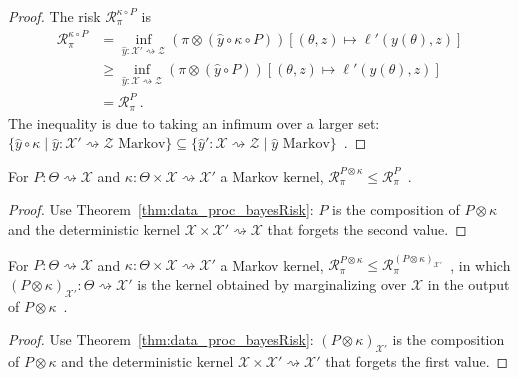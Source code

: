 \begin{proof}\mathlibok
\uses{}
The risk $\mathcal R^{\kappa \circ P}_\pi$ is
\begin{align*}
\mathcal R^{\kappa \circ P}_\pi
&= \inf_{\hat{y} : \mathcal X' \rightsquigarrow \mathcal Z} (\pi \otimes (\hat{y} \circ \kappa \circ P))\left[(\theta, z) \mapsto \ell'(y(\theta), z)\right]
\\
&\ge \inf_{\hat{y} : \mathcal X \rightsquigarrow \mathcal Z} (\pi \otimes (\hat{y} \circ P))\left[(\theta, z) \mapsto \ell'(y(\theta), z)\right]
\\
&= \mathcal R^{P}_\pi
\: .
\end{align*}
The inequality is due to taking an infimum over a larger set: $\{\hat{y} \circ \kappa \mid \hat{y} : \mathcal X' \rightsquigarrow \mathcal Z \text{ Markov}\} \subseteq \{\hat{y}' : \mathcal X \rightsquigarrow \mathcal Z \mid \hat{y} \text{ Markov}\}$~.
\end{proof}

\begin{lemma}
  \label{lem:bayesRisk_compProd_le_fst}
  \mathlibok
  For $P : \Theta \rightsquigarrow \mathcal X$ and $\kappa : \Theta \times \mathcal X \rightsquigarrow \mathcal X'$ a Markov kernel, $\mathcal R^{P \otimes \kappa}_\pi \le \mathcal R^{P}_\pi$~.
\end{lemma}

\begin{proof}\mathlibok
{}
Use Theorem~\ref{thm:data_proc_bayesRisk}: $P$ is the composition of $P \otimes \kappa$ and the deterministic kernel $\mathcal X \times \mathcal X' \rightsquigarrow \mathcal X$ that forgets the second value.
\end{proof}

\begin{lemma}
  \label{lem:bayesRisk_compProd_le_snd}
  For $P : \Theta \rightsquigarrow \mathcal X$ and $\kappa : \Theta \times \mathcal X \rightsquigarrow \mathcal X'$ a Markov kernel, $\mathcal R^{P \otimes \kappa}_\pi \le \mathcal R^{(P \otimes \kappa)_{\mathcal X'}}_\pi$~, in which $(P \otimes \kappa)_{\mathcal X'} : \mathcal \Theta \rightsquigarrow \mathcal X'$ is the kernel obtained by marginalizing over $\mathcal X$ in the output of $P \otimes \kappa$~.
\end{lemma}

\begin{proof}%
{}
Use Theorem~\ref{thm:data_proc_bayesRisk}: $(P \otimes \kappa)_{\mathcal X'}$ is the composition of $P \otimes \kappa$ and the deterministic kernel $\mathcal X \times \mathcal X' \rightsquigarrow \mathcal X'$ that forgets the first value.
\end{proof}

